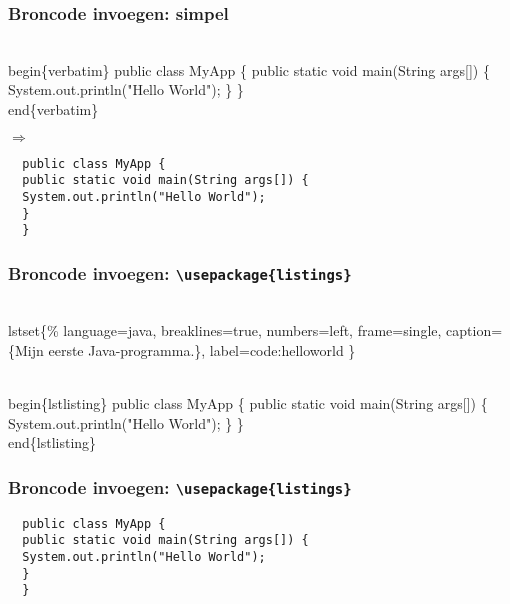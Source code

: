 \documentclass[aspectratio=169]{beamer}
\begin{document}
\begin{frame}[fragile]
  \frametitle{Broncode invoegen: simpel}
  
  \begin{semiverbatim}
    \alert{\\begin\{verbatim\}}
    public class MyApp \{
    public static void main(String args[]) \{
    System.out.println("Hello World");
    \}
    \}
    \alert{\\end\{verbatim\}}
  \end{semiverbatim}
  $\Rightarrow$
  \begin{verbatim}
  public class MyApp {
  public static void main(String args[]) {
  System.out.println("Hello World");
  }
  }
  \end{verbatim}  
  
\end{frame}

\begin{frame}[fragile]
  \frametitle{Broncode invoegen: \texttt{\textbackslash{}usepackage\{listings\}}}
  
  \begin{semiverbatim}
    \\lstset\{\%
    language=java,    breaklines=true,
    numbers=left,     frame=single,
    caption=\{Mijn eerste Java-programma.\},
    label=code:helloworld
    \}
    
    \alert{\\begin\{lstlisting\}}
    public class MyApp \{
    public static void main(String args[]) \{
    System.out.println("Hello World");
    \}
    \}
    \alert{\\end\{lstlisting\}}
  \end{semiverbatim}
  
\end{frame}

\begin{frame}[fragile]
  \frametitle{Broncode invoegen:  \texttt{\textbackslash{}usepackage\{listings\}}}
  
  
  \begin{lstlisting}
  public class MyApp {
  public static void main(String args[]) {
  System.out.println("Hello World");
  }
  }
  \end{lstlisting}
  
\end{frame}
\end{document}
